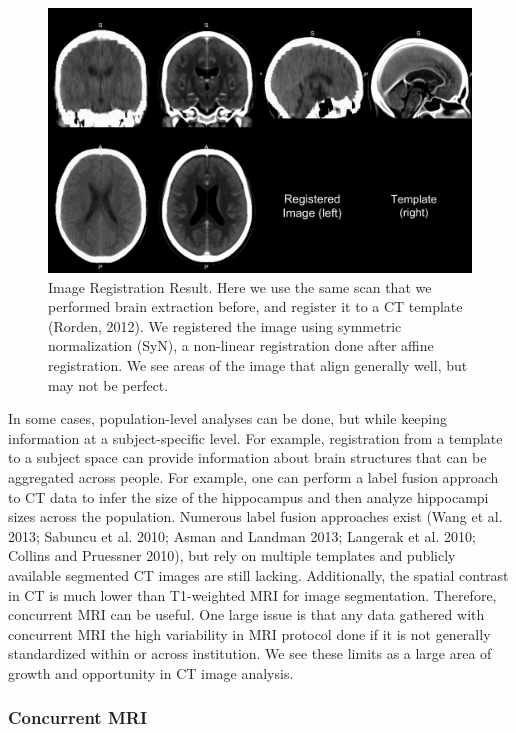 \documentclass[]{elsarticle} %
\begin{document}
\begin{figure}
\includegraphics[width=1\linewidth]{reg_image} \caption{Image Registration Result.  Here we use the same scan that we performed brain extraction before, and register it to a CT template (Rorden, 2012).  We registered the image using symmetric normalization (SyN), a non-linear registration done after affine registration.  We see areas of the image that align generally well, but may not be perfect.}\label{fig:reg}
\end{figure}

In some cases, population-level analyses can be done, but while keeping information at a subject-specific level. For example, registration from a template to a subject space can provide information about brain structures that can be aggregated across people. For example, one can perform a label fusion approach to CT data to infer the size of the hippocampus and then analyze hippocampi sizes across the population. Numerous label fusion approaches exist (Wang et al. 2013; Sabuncu et al. 2010; Asman and Landman 2013; Langerak et al. 2010; Collins and Pruessner 2010), but rely on multiple templates and publicly available segmented CT images are still lacking. Additionally, the spatial contrast in CT is much lower than T1-weighted MRI for image segmentation. Therefore, concurrent MRI can be useful. One large issue is that any data gathered with concurrent MRI the high variability in MRI protocol done if it is not generally standardized within or across institution. We see these limits as a large area of growth and opportunity in CT image analysis.

\hypertarget{concurrent-mri}{%
\subsubsection{Concurrent MRI}\label{concurrent-mri}}
\end{document}
